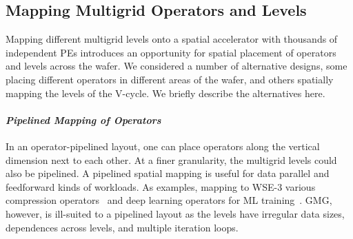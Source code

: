 \documentclass[conference]{IEEEtran}
\begin{document}
    
        \subsection{Mapping Multigrid Operators and Levels} 
        \label{sec:mapping_alternatives}
            Mapping different multigrid levels onto a spatial accelerator with thousands of independent PEs introduces an opportunity for spatial placement of operators and levels across the wafer. %
            We considered a number of alternative designs, some placing different operators in different areas of the wafer, and others spatially mapping the levels of the V-cycle.
            We briefly describe the alternatives here.

            \paragraph{\textit{Pipelined Mapping of Operators}}
            In an operator-pipelined layout, one can place operators
            along the vertical dimension next to each other. At a finer granularity, the multigrid levels could also be pipelined.
            A pipelined spatial mapping is useful for data parallel and feedforward kinds of workloads.  As examples, mapping to WSE-3 
            various compression operators~\cite{song_ceresz} %
            and deep learning operators for ML training~\cite{cerebras_execution_modes,cerebras_pipeline_dl}. GMG, however, is ill-suited to a pipelined layout as the levels have irregular data sizes, dependences across levels, and multiple iteration loops.
\end{document}

